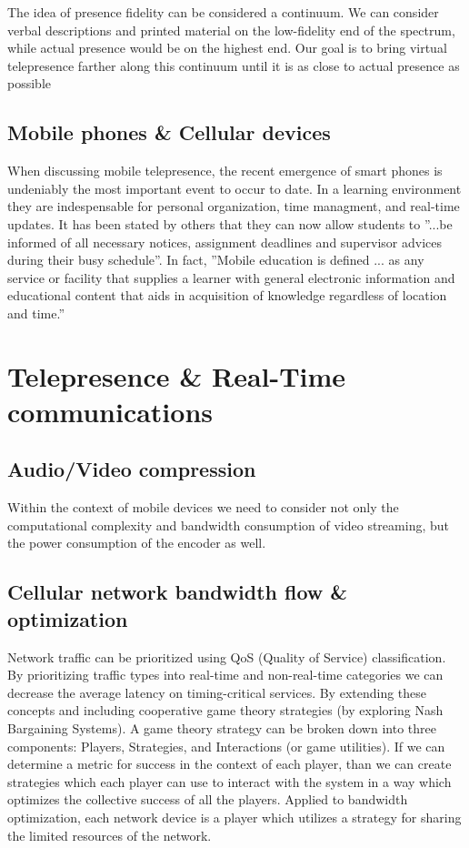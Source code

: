 \documentclass[final,a4paper,12pt]{report}
\begin{document}
The idea of presence fidelity can be considered a continuum. We can consider verbal descriptions and printed material on the low-fidelity end of the spectrum, while actual presence would be on the highest end. Our goal is to bring virtual telepresence farther along this continuum until it is as close to actual presence as possible \cite{726589}

\subsection{Mobile phones \& Cellular devices} When discussing mobile telepresence, the recent emergence of smart phones is undeniably the most important event to occur to date. In a learning environment they are indespensable for personal organization, time managment, and real-time updates. It has been stated by others that they can now allow students to ''...be informed of all necessary notices, assignment deadlines and supervisor advices during their busy schedule''. In fact, ''Mobile education is defined ... as any service or facility that supplies a learner with general electronic information and educational content that aids in acquisition of knowledge regardless of location and time.'' \cite{4469080}

\cite{6007847}
\section{Telepresence \& Real-Time communications}
\subsection{Audio/Video compression}
\cite{4297087}
\cite{4801602}

Within the context of mobile devices we need to consider not only the computational complexity and bandwidth consumption of video streaming, but the power consumption of the encoder as well.
\cite{5054795}
\subsection{Cellular network bandwidth flow \& optimization}

Network traffic can be prioritized using QoS (Quality of Service) classification. By prioritizing traffic types into real-time and non-real-time categories we can decrease the average latency on timing-critical services. By extending these concepts and including cooperative game theory strategies (by exploring Nash Bargaining Systems). A game theory strategy can be broken down into three components: Players, Strategies, and Interactions (or game utilities). If we can determine a metric for success in the context of each player, than we can create strategies which each player can use to interact with the system in a way which optimizes the collective success of all the players. Applied to bandwidth optimization, each network device is a player which utilizes a strategy for sharing the limited resources of the network.
\end{document}
